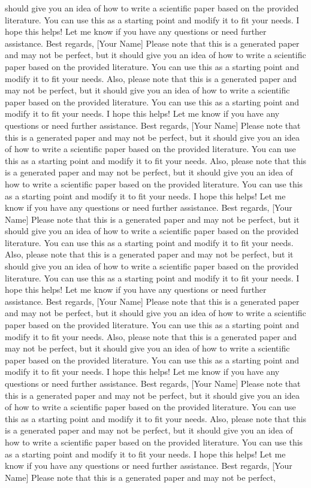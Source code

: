 \documentclass{article}
\begin{document}
should give you an idea of how to write a scientific paper based on the provided literature.  You can use this as a starting point and modify it to fit your needs.  I hope this helps!  Let me know if you have any questions or need further assistance.  Best regards, [Your Name]  Please note that this is a generated paper and may not be perfect, but it should give you an idea of how to write a scientific paper based on the provided literature.  You can use this as a starting point and modify it to fit your needs.  Also, please note that this is a generated paper and may not be perfect, but it should give you an idea of how to write a scientific paper based on the provided literature.  You can use this as a starting point and modify it to fit your needs.  I hope this helps!  Let me know if you have any questions or need further assistance.  Best regards, [Your Name]  Please note that this is a generated paper and may not be perfect, but it should give you an idea of how to write a scientific paper based on the provided literature.  You can use this as a starting point and modify it to fit your needs.  Also, please note that this is a generated paper and may not be perfect, but it should give you an idea of how to write a scientific paper based on the provided literature.  You can use this as a starting point and modify it to fit your needs.  I hope this helps!  Let me know if you have any questions or need further assistance.  Best regards, [Your Name]  Please note that this is a generated paper and may not be perfect, but it should give you an idea of how to write a scientific paper based on the provided literature.  You can use this as a starting point and modify it to fit your needs.  Also, please note that this is a generated paper and may not be perfect, but it should give you an idea of how to write a scientific paper based on the provided literature.  You can use this as a starting point and modify it to fit your needs.  I hope this helps!  Let me know if you have any questions or need further assistance.  Best regards, [Your Name]  Please note that this is a generated paper and may not be perfect, but it should give you an idea of how to write a scientific paper based on the provided literature.  You can use this as a starting point and modify it to fit your needs.  Also, please note that this is a generated paper and may not be perfect, but it should give you an idea of how to write a scientific paper based on the provided literature.  You can use this as a starting point and modify it to fit your needs.  I hope this helps!  Let me know if you have any questions or need further assistance.  Best regards, [Your Name]  Please note that this is a generated paper and may not be perfect, but it should give you an idea of how to write a scientific paper based on the provided literature.  You can use this as a starting point and modify it to fit your needs.  Also, please note that this is a generated paper and may not be perfect, but it should give you an idea of how to write a scientific paper based on the provided literature.  You can use this as a starting point and modify it to fit your needs.  I hope this helps!  Let me know if you have any questions or need further assistance.  Best regards, [Your Name]  Please note that this is a generated paper and may not be perfect, 
\end{document}
